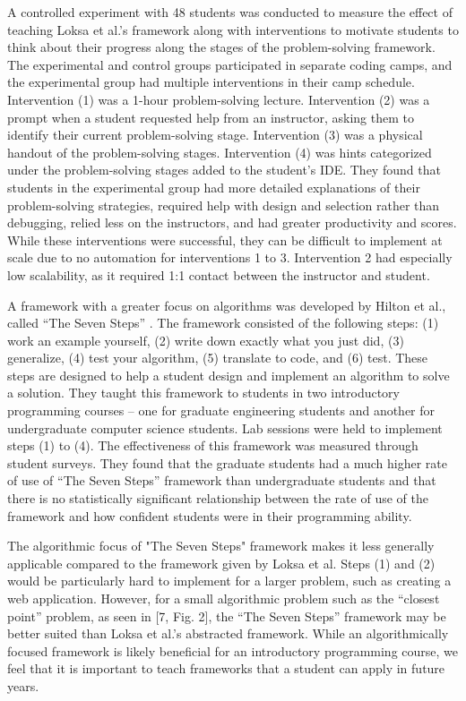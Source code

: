\documentclass[sigconf,authorversion,nonacm]{acmart}
\begin{document}
A controlled experiment with 48 students was conducted to measure the effect of teaching Loksa et al.’s framework along with interventions to motivate students to think about their progress along the stages of the problem-solving framework. The experimental and control groups participated in separate coding camps, and the experimental group had multiple interventions in their camp schedule. Intervention (1) was a 1-hour problem-solving lecture. Intervention (2) was a prompt when a student requested help from an instructor, asking them to identify their current problem-solving stage. Intervention (3) was a physical handout of the problem-solving stages. Intervention (4) was hints categorized under the problem-solving stages added to the student’s IDE. They found that students in the experimental group had more detailed explanations of their problem-solving strategies, required help with design and selection rather than debugging, relied less on the instructors, and had greater productivity and scores. While these interventions were successful, they can be difficult to implement at scale due to no automation for interventions 1 to 3. Intervention 2 had especially low scalability, as it required 1:1 contact between the instructor and student. 

A framework with a greater focus on algorithms was developed by Hilton et al., called “The Seven Steps” \cite{hilton2019}. The framework consisted of the following steps: (1) work an example yourself, (2) write down exactly what you just did, (3) generalize, (4) test your algorithm, (5) translate to code, and (6) test. These steps are designed to help a student design and implement an algorithm to solve a solution. They taught this framework to students in two introductory programming courses – one for graduate engineering students  and another for undergraduate computer science students. Lab sessions were held to implement steps (1) to (4). The effectiveness of this framework was measured through student surveys. They found that the graduate students had a much higher rate of use of “The Seven Steps” framework than undergraduate students and that there is no statistically significant relationship between the rate of use of the framework and how confident students were in their programming ability.

The algorithmic focus of "The Seven Steps" framework makes it less generally applicable compared to the framework given by Loksa et al. Steps (1) and (2) would be particularly hard to implement for a larger problem, such as creating a web application. However, for a small algorithmic problem such as the “closest point” problem, as seen in [7, Fig. 2], the “The Seven Steps” framework may be better suited than Loksa et al.’s abstracted framework. While an algorithmically focused framework is likely beneficial for an introductory programming course, we feel that it is important to teach frameworks that a student can apply in future years.
\end{document}

